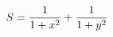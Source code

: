\documentclass[preview]{standalone}
\begin{document}
\begin{align*}
\special{dvisvgm:raw <g id='unique000'>}S=\frac{1}{1+x^2}+\frac{1}{1+y^2}\special{dvisvgm:raw </g>}
\end{align*}
\end{document}
